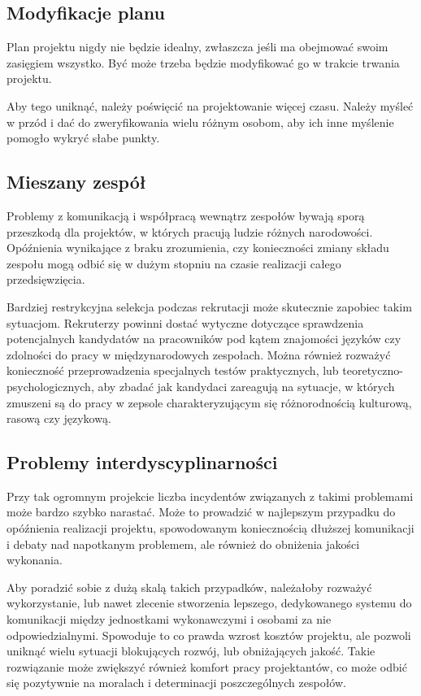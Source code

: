 \subsection{Modyfikacje planu}
Plan projektu nigdy nie będzie idealny, zwłaszcza jeśli ma obejmować swoim zasięgiem wszystko. Być może trzeba będzie modyfikować go w trakcie trwania projektu. 

Aby tego uniknąć, należy poświęcić na projektowanie więcej czasu. Należy myśleć w przód i dać do zweryfikowania wielu różnym osobom, aby ich inne myślenie pomogło wykryć słabe punkty.

\subsection{Mieszany zespół}
Problemy z komunikacją i współpracą wewnątrz zespołów bywają sporą przeszkodą dla projektów, w których pracują ludzie różnych narodowości. Opóźnienia wynikające z braku zrozumienia, czy konieczności zmiany składu zespołu mogą odbić się w dużym stopniu na czasie realizacji całego przedsięwzięcia.

Bardziej restrykcyjna selekcja podczas rekrutacji może skutecznie zapobiec takim sytuacjom. Rekruterzy powinni dostać wytyczne dotyczące sprawdzenia potencjalnych kandydatów na pracowników pod kątem znajomości języków czy zdolności do pracy w międzynarodowych zespołach. Można również rozważyć konieczność przeprowadzenia specjalnych testów praktycznych, lub teoretyczno-psychologicznych, aby zbadać jak kandydaci zareagują na sytuacje, w których zmuszeni są do pracy w zepsole charakteryzującym się różnorodnością kulturową, rasową czy językową.

\subsection{Problemy interdyscyplinarności}
Przy tak ogromnym projekcie liczba incydentów związanych z takimi problemami może bardzo szybko narastać. Może to prowadzić w najlepszym przypadku do opóźnienia realizacji projektu, spowodowanym koniecznością dłuższej komunikacji i debaty nad napotkanym problemem, ale również do obniżenia jakości wykonania.

Aby poradzić sobie z dużą skalą takich przypadków, należałoby rozważyć wykorzystanie, lub nawet zlecenie stworzenia lepszego, dedykowanego systemu do komunikacji między jednostkami wykonawczymi i osobami za nie odpowiedzialnymi. Spowoduje to co prawda wzrost kosztów projektu, ale pozwoli uniknąć wielu sytuacji blokujących rozwój, lub obniżających jakość. Takie rozwiązanie może zwiększyć również komfort pracy projektantów, co może odbić się pozytywnie na moralach i determinacji poszczególnych zespołów.

